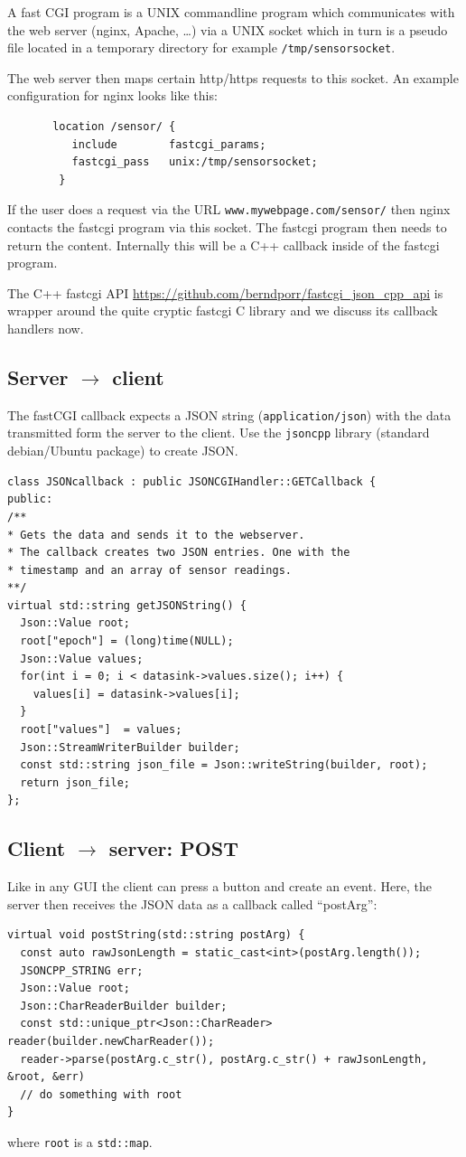 \documentclass[12pt]{report}
\begin{document}
A fast CGI program is a UNIX commandline program which communicates with the web server
(nginx, Apache, \ldots) via a UNIX socket which in turn is a pseudo file located
in a temporary directory for example \texttt{/tmp/sensorsocket}.

The web server then maps certain http/https requests to
this socket. An example configuration for nginx looks like this:
\begin{verbatim}
       location /sensor/ {
          include        fastcgi_params;
          fastcgi_pass   unix:/tmp/sensorsocket;
        }
\end{verbatim}
If the user does a request via the URL \texttt{www.mywebpage.com/sensor/} then
nginx contacts the fastcgi program via this socket. The fastcgi program
then needs to return the content. Internally this will be a C++ callback
inside of the fastcgi program.

The C++ fastcgi API \url{https://github.com/berndporr/fastcgi_json_cpp_api} 
is wrapper around the quite cryptic fastcgi C library and we discuss
its callback handlers now.

\subsection{Server $\to$ client}
The fastCGI callback expects a JSON string (\texttt{application/json}) with the data
transmitted form the server to the client. Use the \texttt{jsoncpp} library (standard debian/Ubuntu package)
to create JSON.
\begin{verbatim}
class JSONcallback : public JSONCGIHandler::GETCallback {
public:
/**
* Gets the data and sends it to the webserver.
* The callback creates two JSON entries. One with the
* timestamp and an array of sensor readings.
**/
virtual std::string getJSONString() {
  Json::Value root;
  root["epoch"] = (long)time(NULL);
  Json::Value values;
  for(int i = 0; i < datasink->values.size(); i++) {
    values[i] = datasink->values[i];
  }
  root["values"]  = values;
  Json::StreamWriterBuilder builder;
  const std::string json_file = Json::writeString(builder, root);
  return json_file;
};
\end{verbatim} 

\subsection{Client $\to$ server: POST}
Like in any GUI the client can press a button and create an event.
Here, the server then receives the JSON data as a callback called ``postArg'':
\begin{verbatim}
virtual void postString(std::string postArg) {
  const auto rawJsonLength = static_cast<int>(postArg.length());
  JSONCPP_STRING err;
  Json::Value root;
  Json::CharReaderBuilder builder;
  const std::unique_ptr<Json::CharReader> reader(builder.newCharReader());
  reader->parse(postArg.c_str(), postArg.c_str() + rawJsonLength, &root, &err)
  // do something with root
}
\end{verbatim}
where \texttt{root} is a \texttt{std::map}.
\end{document}
